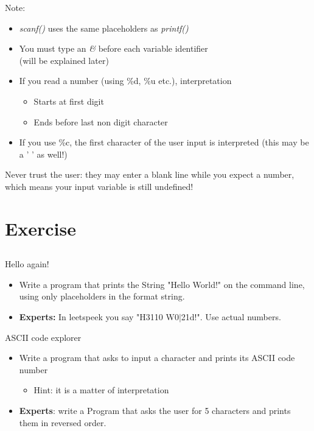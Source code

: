 \begin{frame}{Note:}
	\begin{itemize}
		\item \textit{scanf()} uses the same placeholders as \textit{printf()}
		\item You must type an \textit{\&} before each variable identifier \\
			(will be explained later)
		\item If you read a number (using \%d, \%u etc.), interpretation
		\begin{itemize}
			\item Starts at first digit
			\item Ends before last non digit character
		\end{itemize}
		\item If you use \%c, the first character of the user input is interpreted (this may be a ' ' as well!)
	\end{itemize}
	Never trust the user: they may enter a blank line while you expect a number, which means your input variable is still undefined!
		
\end{frame}
\section{Exercise}
\subsection{}

\begin{frame}[fragile]{Hello again!}
	\begin{itemize}
		\item Write a program that prints the String "Hello World!" on the command line, using only placeholders in the format string.
		\item \textbf{Experts:} In leetspeek you say "H3110 W0$|$21d!". Use actual numbers.
	\end{itemize}
\end{frame}
\begin{frame}[fragile]{ASCII code explorer}
	\begin{itemize}
		\item Write a program that asks to input a character and prints its ASCII code number
		\begin{itemize}
			\item<2-> Hint: it is a matter of interpretation
		\end{itemize}
		\item \textbf{Experts}: write a Program that asks the user for 5 characters and prints them in reversed order.

	\end{itemize}	
\end{frame}

